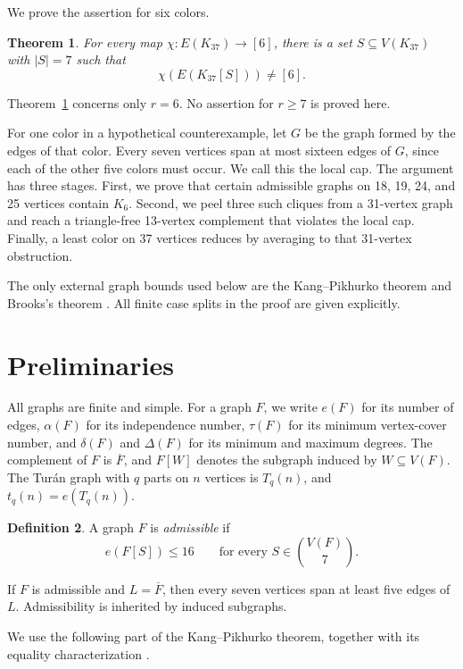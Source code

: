 \documentclass[11pt,reqno,a4paper]{amsart}
\newtheorem{theorem}{Theorem}[section]
\theoremstyle{definition}
\newtheorem{definition}[theorem]{Definition}
\theoremstyle{remark}
\newcommand{\comp}[1]{\overline{#1}}
\begin{document}
We prove the assertion for six colors.

\begin{theorem}\label{thm:main}
For every map $\chi:E(K_{37})\to[6]$, there is a set
$S\subseteq V(K_{37})$ with $|S|=7$ such that
\[
  \chi\!\left(E(K_{37}[S])\right)\ne[6].
\]
\end{theorem}

Theorem~\ref{thm:main} concerns only $r=6$.  No assertion for $r\geq7$ is
proved here.

For one color in a hypothetical counterexample, let $G$ be the graph formed
by the edges of that color.  Every seven vertices span at most sixteen edges
of $G$, since each of the other five colors must occur.  We call this the
local cap.  The argument has three stages.  First, we prove that certain
admissible graphs on 18, 19, 24, and 25 vertices contain $K_6$.  Second, we
peel three such cliques from a 31-vertex graph and reach a triangle-free
13-vertex complement that violates the local cap.  Finally, a least color on
37 vertices reduces by averaging to that 31-vertex obstruction.

The only external graph bounds used below are the Kang--Pikhurko theorem
\cite{KangPikhurko2005} and Brooks's theorem \cite{Brooks1941}.  All finite
case splits in the proof are given explicitly.

\section{Preliminaries}

All graphs are finite and simple.  For a graph $F$, we write $e(F)$ for its
number of edges, $\alpha(F)$ for its independence number, $\tau(F)$ for its
minimum vertex-cover number, and $\delta(F)$ and $\Delta(F)$ for its minimum
and maximum degrees.  The complement of $F$ is $\comp F$, and $F[W]$ denotes
the subgraph induced by $W\subseteq V(F)$.  The Tur\'an graph with $q$ parts
on $n$ vertices is $T_q(n)$, and $t_q(n)=e(T_q(n))$.

\begin{definition}\label{def:admissible}
A graph $F$ is \emph{admissible} if
\[
  e(F[S])\leq16
  \qquad\text{for every }S\in\binom{V(F)}7.
\]
\end{definition}

If $F$ is admissible and $L=\comp F$, then every seven vertices span at
least five edges of $L$.  Admissibility is inherited by induced subgraphs.

We use the following part of the Kang--Pikhurko theorem, together with its
equality characterization \cite[Theorems 1 and 4 and Lemma 5]{KangPikhurko2005}.
\end{document}
